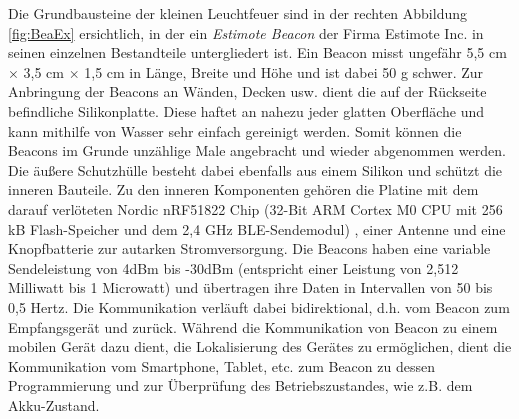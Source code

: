 Die Grundbausteine der kleinen Leuchtfeuer sind in der rechten Abbildung \ref{fig:BeaEx} ersichtlich, in der ein \textit{Estimote Beacon} der Firma Estimote Inc. in seinen einzelnen Bestandteile untergliedert ist. Ein Beacon misst ungefähr 5,5 cm $\times$ 3,5 cm $\times$ 1,5 cm in Länge, Breite und Höhe und ist dabei 50 g schwer. Zur Anbringung der Beacons an Wänden, Decken usw. dient die auf der Rückseite befindliche Silikonplatte. Diese haftet an nahezu jeder glatten Oberfläche und kann mithilfe von Wasser sehr einfach gereinigt werden. Somit können die Beacons im Grunde unzählige Male angebracht und wieder abgenommen werden. Die äußere Schutzhülle besteht dabei ebenfalls aus einem Silikon und schützt die inneren Bauteile. Zu den inneren Komponenten gehören die Platine mit dem darauf verlöteten Nordic nRF51822 Chip (32-Bit ARM Cortex M0 CPU mit 256 kB Flash-Speicher und dem 2,4 GHz BLE-Sendemodul) \cite{nRF5}, einer Antenne und eine Knopfbatterie zur autarken Stromversorgung. Die Beacons haben eine variable Sendeleistung von 4dBm bis -30dBm (entspricht einer Leistung von 2,512 Milliwatt bis 1 Microwatt) und übertragen ihre Daten in Intervallen von 50 bis 0,5 Hertz. Die Kommunikation verläuft dabei bidirektional, d.h. vom Beacon zum Empfangsgerät und zurück. Während die Kommunikation von Beacon zu einem mobilen Gerät dazu dient, die Lokalisierung des Gerätes zu ermöglichen, dient die Kommunikation vom Smartphone, Tablet, etc. zum Beacon zu dessen Programmierung und zur Überprüfung des Betriebszustandes, wie z.B. dem Akku-Zustand. \\ \\
